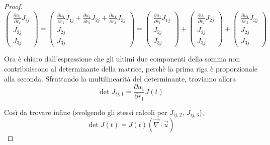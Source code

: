 \documentclass{report}
\begin{document}
\begin{proof}
    \begin{equation}
    \begin{pmatrix}
        \frac{\partial u_1}{\partial r_i}J_{ij} \\
        J_{2j} \\
        J_{3j}
    \end{pmatrix}
    = 
    \begin{pmatrix}
        \frac{\partial u_1}{\partial r_1}J_{1j} + \frac{\partial u_1}{\partial r_2}J_{2j} + \frac{\partial u_1}{\partial r_3}J_{3j}\\
        J_{2j} \\
        J_{3j}
    \end{pmatrix}
    = 
    \begin{pmatrix}
        \frac{\partial u_1}{\partial r_1}J_{1j}\\
        J_{2j} \\
        J_{3j}
    \end{pmatrix}
    +
    \begin{pmatrix}
        \frac{\partial u_1}{\partial r_2}J_{2j}\\
        J_{2j} \\
        J_{3j}
    \end{pmatrix}
    +
    \begin{pmatrix}
        \frac{\partial u_1}{\partial r_3}J_{3j}\\
        J_{2j} \\
        J_{3j}
    \end{pmatrix}
    \end{equation}

    Ora è chiaro dall'espressione che gli ultimi due componenti della somma non contribuiscono al determinante della matrice, perchè la prima riga è proporzionale alla seconda. Sfruttando la multilinearità del determinante, troviamo allora 
    \begin{equation}
        \det{J_{ij, 1}} = \frac{\partial u_1}{\partial r_1}J(t)
    \end{equation}

    Così da trovare infine (svolgendo gli stessi calcoli per $J_{ij, 2}, \, J_{ij,3}$), 
    \begin{equation}
        \det{J(t)} = J(t)(\vec{\nabla} \cdot \vec{u})
    \end{equation}
    
\end{proof}
\end{document}
